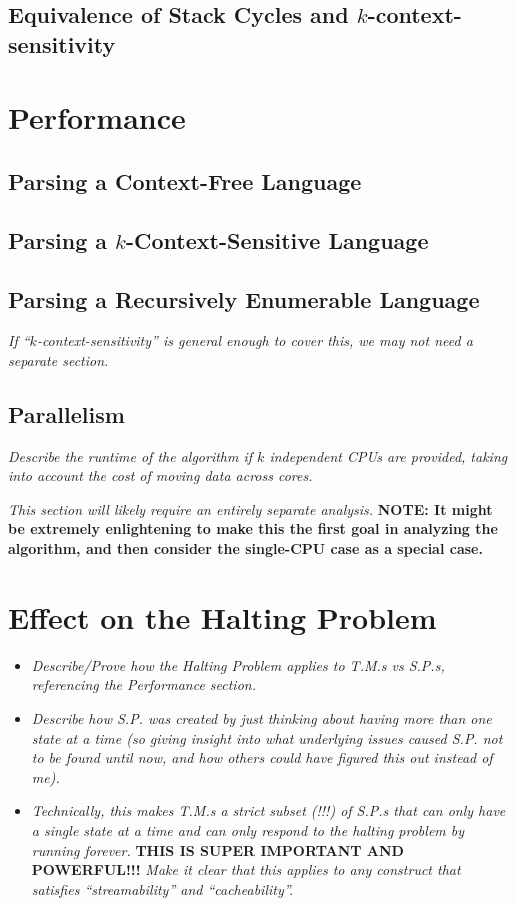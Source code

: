 \documentclass{article}
\begin{document}
\subsection{Equivalence of Stack Cycles and $k$-context-sensitivity}

\section{Performance}
\subsection{Parsing a Context-Free Language}
\subsection{Parsing a $k$-Context-Sensitive Language}
\subsection{Parsing a Recursively Enumerable Language}
\textit{If ``$k$-context-sensitivity'' is general enough to cover this, we may not need a separate section.}

\subsection{Parallelism}
\textit{Describe the runtime of the algorithm if $k$ independent CPUs are provided, taking into account the cost of moving data across cores.}

\textit{This section will likely require an entirely separate analysis.} \textbf{NOTE: It might be extremely enlightening to make this the first goal in analyzing the algorithm, and then consider the single-CPU case as a special case.}

\section{Effect on the Halting Problem}
\begin{itemize}
  \item \textit{Describe/Prove how the Halting Problem applies to T.M.s vs S.P.s, referencing the Performance section.}
  \item \textit{Describe how S.P. was created by just thinking about having more than one state at a time (so giving insight into what underlying issues caused S.P. not to be found until now, and how others could have figured this out instead of me).}
  \item \textit{Technically, this makes T.M.s a strict subset (!!!) of S.P.s that can only have a single state at a time and can only respond to the halting problem by running forever.} \textbf{THIS IS SUPER IMPORTANT AND POWERFUL!!!} \textit{Make it clear that this applies to any construct that satisfies ``streamability'' and ``cacheability''.}
\end{itemize}
\end{document}
